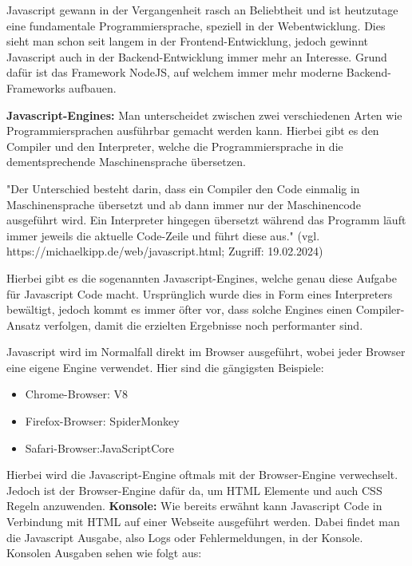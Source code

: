 Javascript gewann in der Vergangenheit rasch an Beliebtheit und ist heutzutage eine fundamentale Programmiersprache, speziell in der Webentwicklung. Dies sieht man schon seit langem in der Frontend-Entwicklung, jedoch gewinnt Javascript auch in der Backend-Entwicklung immer mehr an Interesse. Grund dafür ist das Framework NodeJS, auf welchem  immer mehr moderne Backend-Frameworks aufbauen.

\textbf{Javascript-Engines:}
\newline
Man unterscheidet zwischen zwei verschiedenen Arten wie Programmiersprachen ausführbar gemacht werden kann. Hierbei gibt es den Compiler und den Interpreter, welche die Programmiersprache in die dementsprechende Maschinensprache übersetzen.

"Der Unterschied besteht darin, dass ein Compiler den Code einmalig in Maschinensprache übersetzt und ab dann immer nur der Maschinencode ausgeführt wird. Ein Interpreter hingegen übersetzt während das Programm läuft immer jeweils die aktuelle Code-Zeile und führt diese aus."
\newline
(vgl. https://michaelkipp.de/web/javascript.html; Zugriff: 19.02.2024)

Hierbei gibt es die sogenannten Javascript-Engines, welche genau diese Aufgabe für Javascript Code macht. Ursprünglich wurde dies in Form eines Interpreters bewältigt, jedoch kommt es immer öfter vor, dass solche Engines einen Compiler-Ansatz verfolgen, damit die erzielten Ergebnisse noch performanter sind.

Javascript wird im Normalfall direkt im Browser ausgeführt, wobei jeder Browser eine eigene Engine verwendet. Hier sind die gängigsten Beispiele:

\begin{itemize}
  \item Chrome-Browser: V8
  \item Firefox-Browser: SpiderMonkey
  \item Safari-Browser:JavaScriptCore
\end{itemize}

Hierbei wird die Javascript-Engine oftmals mit der Browser-Engine verwechselt. Jedoch ist der Browser-Engine dafür da, um HTML Elemente und auch CSS Regeln anzuwenden. 
\newpage
\textbf{Konsole:}
\newline
Wie bereits erwähnt kann Javascript Code in Verbindung mit HTML auf einer Webseite ausgeführt werden. Dabei findet man die Javascript Ausgabe, also Logs oder Fehlermeldungen, in der Konsole. Konsolen Ausgaben sehen wie folgt aus:

